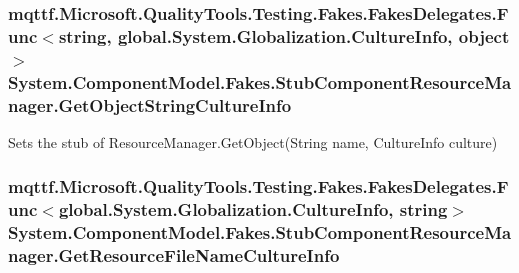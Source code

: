 \hypertarget{class_system_1_1_component_model_1_1_fakes_1_1_stub_component_resource_manager_ab7d9ffb5fdc3a9412acfeab9447aa485}{
\subsubsection[{Get\-Object\-String\-Culture\-Info}]{\setlength{\rightskip}{0pt plus 5cm}mqttf.\-Microsoft.\-Quality\-Tools.\-Testing.\-Fakes.\-Fakes\-Delegates.\-Func$<$string, global.\-System.\-Globalization.\-Culture\-Info, object$>$ System.\-Component\-Model.\-Fakes.\-Stub\-Component\-Resource\-Manager.\-Get\-Object\-String\-Culture\-Info}}\label{class_system_1_1_component_model_1_1_fakes_1_1_stub_component_resource_manager_ab7d9ffb5fdc3a9412acfeab9447aa485}


Sets the stub of Resource\-Manager.\-Get\-Object(\-String name, Culture\-Info culture)

\hypertarget{class_system_1_1_component_model_1_1_fakes_1_1_stub_component_resource_manager_a96e05199447d4cad66267df54c5fb0ff}{
\subsubsection[{Get\-Resource\-File\-Name\-Culture\-Info}]{\setlength{\rightskip}{0pt plus 5cm}mqttf.\-Microsoft.\-Quality\-Tools.\-Testing.\-Fakes.\-Fakes\-Delegates.\-Func$<$global.\-System.\-Globalization.\-Culture\-Info, string$>$ System.\-Component\-Model.\-Fakes.\-Stub\-Component\-Resource\-Manager.\-Get\-Resource\-File\-Name\-Culture\-Info}}\label{class_system_1_1_component_model_1_1_fakes_1_1_stub_component_resource_manager_a96e05199447d4cad66267df54c5fb0ff}


